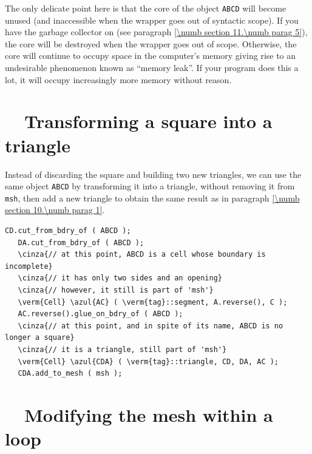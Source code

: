 The only delicate point here is that the core of the {\small\tt{}} object
{\small\tt ABCD}
will become unused (and inaccessible when the wrapper goes out of syntactic scope).
If you have the garbage collector on (see paragraph \ref{\numb section 11.\numb parag 5}),
the core will be destroyed when the wrapper goes out of scope.
Otherwise, the core will continue to occupy space in the computer's memory giving rise
to an undesirable phenomenon known as ``memory leak''.
If your program does this a lot, it will occupy increasingly more memory without reason.


\section{~~{Transforming a square into a triangle}}\label{\numb section 10.\numb parag 2}

Instead of discarding the square and building two new triangles, we can use the same
{\small\tt{}} object {\small\tt ABCD}
by transforming it into a triangle, without removing it from {\small\tt msh}, then add
a new triangle to obtain the same result as in paragraph \ref{\numb section 10.\numb parag 1}.

\begin{Verbatim}[commandchars=\\\{\},formatcom=\small\tt,frame=single,
   label=parag-\ref{\numb section 10.\numb parag 2}.cpp,rulecolor=\color{coment},
   baselinestretch=0.94,framesep=2mm]
   CD.cut_from_bdry_of ( ABCD );
   DA.cut_from_bdry_of ( ABCD );
   \cinza{// at this point, ABCD is a cell whose boundary is incomplete}
   \cinza{// it has only two sides and an opening}
   \cinza{// however, it still is part of 'msh'}
   \verm{Cell} \azul{AC} ( \verm{tag}::segment, A.reverse(), C );
   AC.reverse().glue_on_bdry_of ( ABCD );
   \cinza{// at this point, and in spite of its name, ABCD is no longer a square}
   \cinza{// it is a triangle, still part of 'msh'}
   \verm{Cell} \azul{CDA} ( \verm{tag}::triangle, CD, DA, AC );
   CDA.add_to_mesh ( msh );
\end{Verbatim}



\section{~~Modifying the mesh within a loop}\label{\numb section 10.\numb parag 3}

